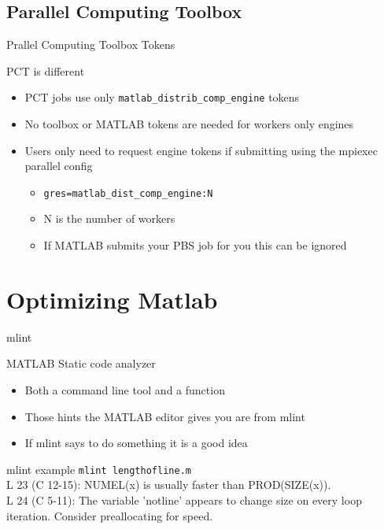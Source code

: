 \documentclass[handout]{beamer}
\begin{document}
   \subsection{Parallel Computing Toolbox}
   \begin{frame}{Prallel Computing Toolbox Tokens}
    \begin{block}{PCT is different}
     \begin{itemize}
      \item PCT jobs use only \texttt{matlab\_distrib\_comp\_engine} tokens 
      \item No toolbox or MATLAB tokens are needed for workers only engines
      \item Users only need to request engine tokens if submitting using the mpiexec parallel config
      \begin{itemize}
       \item \texttt{gres=matlab\_dist\_comp\_engine:N}
       \item N is the number of workers
       \item If MATLAB submits your PBS job for you this can be ignored
      \end{itemize}
     \end{itemize}
    \end{block}
   \end{frame}

  \section{Optimizing Matlab}
  \begin{frame}{mlint}
   \begin{block}{MATLAB Static code analyzer}
    \begin{itemize}
     \item Both a command line tool and a function
     \item Those hints the MATLAB editor gives you are from mlint
     \item If mlint says to do something it is a good idea
    \end{itemize}
   \end{block}
   \begin{block}{mlint example}
    \texttt{mlint lengthofline.m} \\
L 23 (C 12-15): NUMEL(x) is usually faster than PROD(SIZE(x)). \\
L 24 (C 5-11): The variable 'notline' appears to change size on every loop iteration. Consider preallocating for speed.
   \end{block}
  \end{frame}
\end{document}
